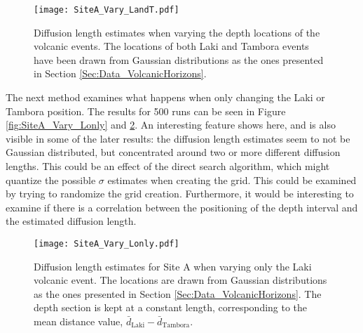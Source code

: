 \documentclass[../../CompleteThesis2/Complete_2ndDraft]{subfiles}
\begin{document}

\begin{figure}[!htb]
	\centering
	\texttt{[image: SiteA\_Vary\_LandT.pdf]}
	\caption[Diffusion Length Variations, Varying Laki and Tambora]{\small Diffusion length estimates when varying the depth locations of the volcanic events. The locations of both Laki and Tambora events have been drawn from Gaussian distributions as the ones presented in Section \ref{Sec:Data_VolcanicHorizons}.}
	\label{fig:SiteA_Vary_LandT}
\end{figure}

The next method examines what happens when only changing the Laki or Tambora position. The results for 500 runs can be seen in Figure \ref{fig:SiteA_Vary_Lonly} and \ref{fig:SiteA_Vary_Tonly}. An interesting feature shows here, and is also visible in some of the later results: the diffusion length estimates seem to not be Gaussian distributed, but concentrated around two or more different diffusion lengths. This could be an effect of the direct search algorithm, which might quantize the possible $\sigma$ estimates when creating the grid. This could be examined by trying to randomize the grid creation. Furthermore, it would be interesting to examine if there is a correlation between the positioning of the depth interval and the estimated diffusion length.  


\begin{figure}[!htb]
	\centering
	\texttt{[image: SiteA\_Vary\_Lonly.pdf]}
	\caption[Diffusion Length Variations, Varying only Laki]{\small Diffusion length estimates for Site A when varying only the Laki volcanic event. The locations are drawn from Gaussian distributions as the ones presented in Section \ref{Sec:Data_VolcanicHorizons}. The depth section is kept at a constant length, corresponding to the mean distance value, $\bar{d}_{\text{Laki}}-\bar{d}_{\text{Tambora}}$.}
	\label{fig:SiteA_Vary_Tonly}
\end{figure}
\end{document}
